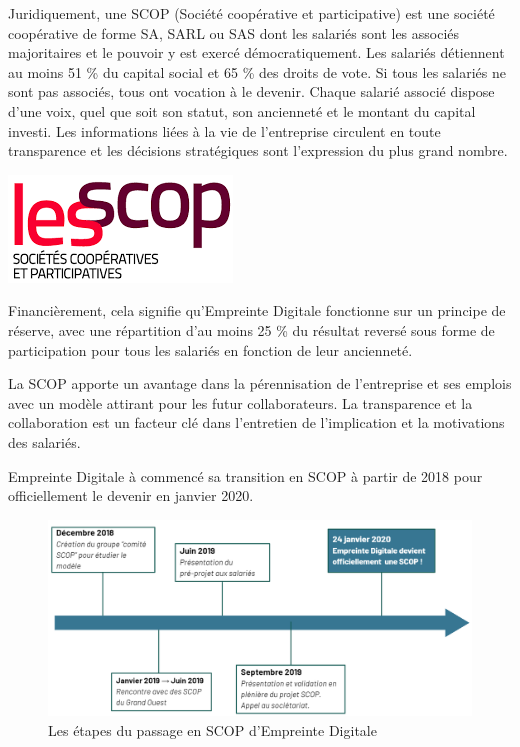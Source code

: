 \documentclass[12pt]{article}
\begin{document}
\noindent%
\begin{minipage}{.7\textwidth}%
Juridiquement, une \gls{SCOP} (Société coopérative et participative) est une société coopérative de forme \gls{SA}, \gls{SARL} ou \gls{SAS} dont les salariés sont les associés majoritaires et le pouvoir y est exercé démocratiquement.
Les salariés détiennent au moins 51 \% du capital social et 65 \% des droits de vote. 
Si tous les salariés ne sont pas associés, tous ont vocation à le devenir. 
Chaque salarié associé dispose d’une voix, quel que soit son statut, son ancienneté et le montant du capital investi.
Les informations liées à la vie de l’entreprise circulent en toute transparence et les décisions stratégiques sont l’expression du plus grand nombre. \cite{Scop} \\
\end{minipage}%
\hfill
\begin{minipage}{.3\textwidth}%
\begin{center}
    \includegraphics[scale=0.7]{src/logo_scop.png}
\end{center}
\end{minipage}%

Financièrement, cela signifie qu'Empreinte Digitale fonctionne sur un principe de réserve, avec une répartition d'au moins 25 \% du résultat reversé sous forme de participation pour tous les salariés en fonction de leur ancienneté.

La \gls{SCOP} apporte un avantage dans la pérennisation de l'entreprise et ses emplois avec un modèle attirant pour les futur collaborateurs. 
La transparence et la collaboration est un facteur clé dans l'entretien de l'implication et la motivations des salariés.

Empreinte Digitale à commencé sa transition en \gls{SCOP} à partir de 2018 pour officiellement le devenir en janvier 2020.
\begin{figure}[!ht]
    \centering
    \includegraphics[width=\textwidth]{src/transition_scop.png}
    \caption{Les étapes du passage en \gls{SCOP} d'Empreinte Digitale}
    \label{fig:transition_scop}
\end{figure}
\end{document}
